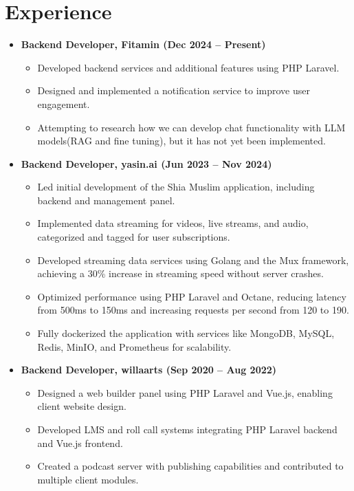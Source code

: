 \documentclass[10pt, letterpaper]{article}
\begin{document}
\section{Experience}
\begin{itemize}[leftmargin=*]
    \item \textbf{Backend Developer, Fitamin (Dec 2024 -- Present)} \\
    \begin{itemize}[leftmargin=1.2em]
        \item Developed backend services and additional features using PHP Laravel.
        \item Designed and implemented a notification service to improve user engagement.
        \item Attempting to research how we can develop chat functionality with LLM models(RAG and fine tuning), but it has not yet been implemented.
    \end{itemize}
    \item \textbf{Backend Developer, yasin.ai (Jun 2023 -- Nov 2024)} \\
    \begin{itemize}[leftmargin=1.2em]
        \item Led initial development of the Shia Muslim application, including backend and management panel.
        \item Implemented data streaming for videos, live streams, and audio, categorized and tagged for user subscriptions.
        \item Developed streaming data services using Golang and the Mux framework, achieving a 30\% increase in streaming speed without server crashes.
        \item Optimized performance using PHP Laravel and Octane, reducing latency from 500ms to 150ms and increasing requests per second from 120 to 190.
        \item Fully dockerized the application with services like MongoDB, MySQL, Redis, MinIO, and Prometheus for scalability.
    \end{itemize}
    \item \textbf{Backend Developer, willaarts (Sep 2020 -- Aug 2022)} \\
    \begin{itemize}[leftmargin=1.2em]
        \item Designed a web builder panel using PHP Laravel and Vue.js, enabling client website design.
        \item Developed LMS and roll call systems integrating PHP Laravel backend and Vue.js frontend.
        \item Created a podcast server with publishing capabilities and contributed to multiple client modules.
    \end{itemize}
\end{itemize}
\end{document}
